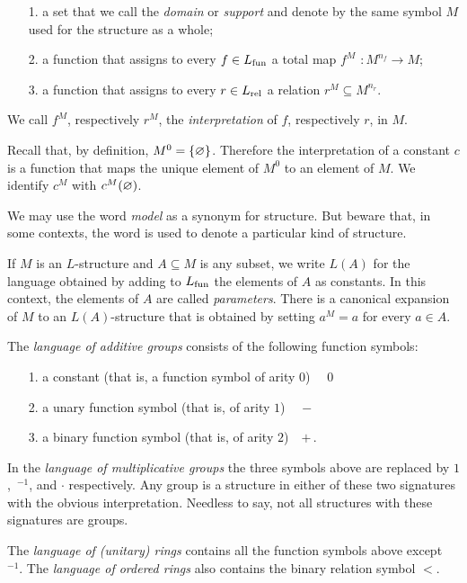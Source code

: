 \begin{itemize}
\item[1.] a set that we call the \emph{domain\/} or \emph{support} and denote by the same symbol $M$ used for the structure as a whole;
\item[2.] a function that assigns to every $f\in L_{\rm fun}$ a total map \emph{$f^M$ $: M^{n_f}\to M$};
\item[3.] a function that assigns to every  $r\in L_{\rm rel}$ a relation \emph{$r^M\subseteq M^{n_r}$}.
\end{itemize}
 We call $f^M$, respectively $r^M$, the \emph{interpretation\/} of $f$, respectively $r$, in $M$.
 
Recall that, by definition, $M^0=\{\varnothing\}$. Therefore the interpretation of a constant $c$ is a function that maps the unique element of $M^0$ to an element of $M$. We identify \emph{$c^M$\/} with $c^M(\varnothing)$.

We may use the word \emph{model\/} as a synonym for structure. But beware that, in some contexts, the word is used to denote a particular kind of structure.  

If $M$ is an $L$-structure and $A\subseteq M$ is any subset, we write \emph{$L(A)$\/} for  the language obtained by  adding to $L_{\rm fun}$ the elements of $A$ as constants. In this context, the elements of $A$ are called \emph{parameters}. There is a canonical expansion of $M$ to an $L(A)$-structure that is obtained by setting $a^M=a$ for every $a\in A$.

\begin{example}\label{LgaLgmLau}
The \emph{language of additive groups\/} consists of the following function symbols:\nobreak
\begin{itemize}
\item[1.] a constant (that is, a function symbol of arity $0$) \ \  $0$
\item[2.] a unary function symbol (that is, of arity $1$) \ \   $-$
\item[3.] a binary function symbol (that is, of arity $2$)\ \  $+ \,$.
\end{itemize}
In the \emph{language of multiplicative groups\/} the three symbols above are replaced by $1$,~${}^{-1}$, and $\cdot$ respectively. Any group is a structure in either of these two signatures with the obvious interpretation. Needless to say, not all structures with these signatures are groups. 

The \emph{language of (unitary) rings\/} contains all the function symbols above except \ ${}^{-1}$. The  \emph{language of ordered rings\/} also contains the binary relation symbol $<$.\QED
\end{example}

